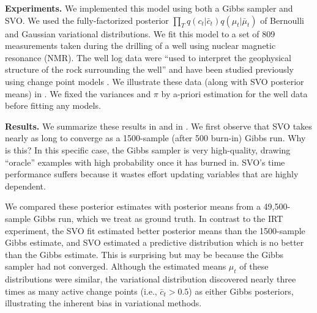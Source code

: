 \textbf{Experiments.} We implemented this model using both a Gibbs
sampler and SVO. We used the fully-factorized posterior $\prod_T
q(c_t | \bar c_t) q(\mu_t | \bar \mu_t)$ of Bernoulli and Gaussian variational
distributions. We fit this model to a set of 809 measurements taken
during the drilling of a well using nuclear magnetic resonance
(NMR). The well log data were ``used to interpret the geophysical
structure of the rock surrounding the well'' \cite{adams:2007} and
have been studied previously using change point models
\cite{ruanaidh:1996,adams:2007}. We illustrate these data (along with
SVO posterior means) in . We fixed the
variances and $\pi$ by a-priori estimation for the well data before
fitting any models.

\textbf{Results.} We summarize these results in
 and in .
We first observe that SVO takes nearly as long to converge as a
1500-sample (after 500 burn-in) Gibbs run.  Why is this? In this
specific case, the Gibbs sampler is very high-quality, drawing
``oracle'' examples with high probability once it has burned in. SVO's
time performance suffers because it wastes effort updating variables
that are highly dependent.

We compared these posterior estimates with posterior means from a
49,500-sample Gibbs run, which we treat as ground truth.  In contrast
to the IRT experiment, the SVO fit estimated better posterior means
than the 1500-sample Gibbs estimate, and SVO estimated a predictive
distribution which is no better than the Gibbs estimate. This is
surprising but may be because the Gibbs sampler had not
converged. Although the estimated means $\mu_t$ of these distributions
were similar, the variational distribution discovered nearly three
times as many active change points (i.e., $\bar c_t > 0.5$) as either Gibbs
posteriors, illustrating the inherent bias in variational methods.


